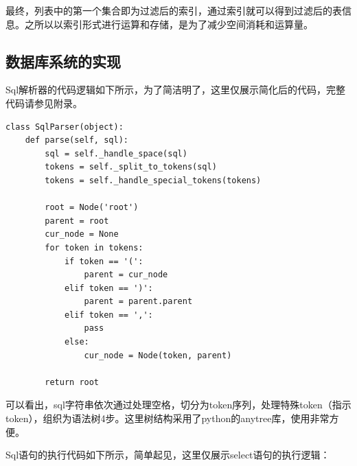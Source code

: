 最终，列表中的第一个集合即为过滤后的索引，通过索引就可以得到过滤后的表信息。之所以以索引形式进行运算和存储，是为了减少空间消耗和运算量。

\subsection{数据库系统的实现}

Sql解析器的代码逻辑如下所示，为了简洁明了，这里仅展示简化后的代码，完整代码请参见附录。

\begin{lstlisting}
class SqlParser(object):
    def parse(self, sql):
        sql = self._handle_space(sql)
        tokens = self._split_to_tokens(sql)
        tokens = self._handle_special_tokens(tokens)

        root = Node('root')
        parent = root
        cur_node = None
        for token in tokens:
            if token == '(':
                parent = cur_node
            elif token == ')':
                parent = parent.parent
            elif token == ',':
                pass
            else:
                cur_node = Node(token, parent)

        return root
\end{lstlisting}

可以看出，sql字符串依次通过处理空格，切分为token序列，处理特殊token（指示token），组织为语法树4步。这里树结构采用了python的anytree库，使用非常方便。

Sql语句的执行代码如下所示，简单起见，这里仅展示select语句的执行逻辑：

